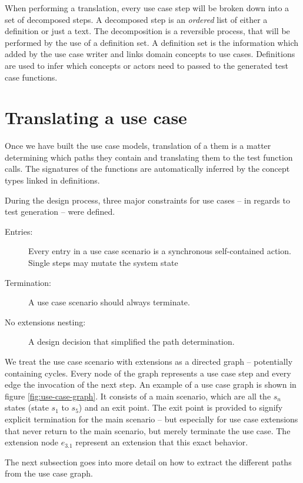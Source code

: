 \noindent When performing a translation, every use case step will be broken down into a set of decomposed steps. A decomposed step is an \emph{ordered} list of either a definition or just a text. The decomposition is a reversible process, that will be performed by the use of a definition set. A definition set is the information which added by the use case writer and links domain concepts to use cases. Definitions are used to infer which concepts or actors need to passed to the generated test case functions.

\section{Translating a use case}
Once we have built the use case models, translation of a them is a matter determining which paths they contain and translating them to the test function calls. The signatures of the functions are automatically inferred by the concept types linked in definitions.\medskip

\noindent During the design process, three major constraints for use cases -- in regards to test generation -- were defined. 
\begin{description}
  \item[Entries:] Every entry in a use case scenario is a synchronous self-contained action. Single steps may mutate the system state
  \item[Termination:] A use case scenario should always terminate.
  \item[No extensions nesting:] A design decision that simplified the path determination.
\end{description}
We treat the use case scenario with extensions as a directed graph -- potentially containing cycles. Every node of the graph represents a use case step and every edge the invocation of the next step. An example of a use case graph is shown in figure \ref{fig:use-case-graph}. It consists of a main scenario, which are all the $s_n$ states (state $s_1$ to $s_5$) and an exit point. The exit point is provided to signify explicit termination for the main scenario -- but especially for use case extensions that never return to the main scenario, but merely terminate the use case. The extension node $e_{3.1}$ represent an extension that this exact behavior.\medskip

\noindent The next subsection goes into more detail on how to extract the different paths from the use case graph.

